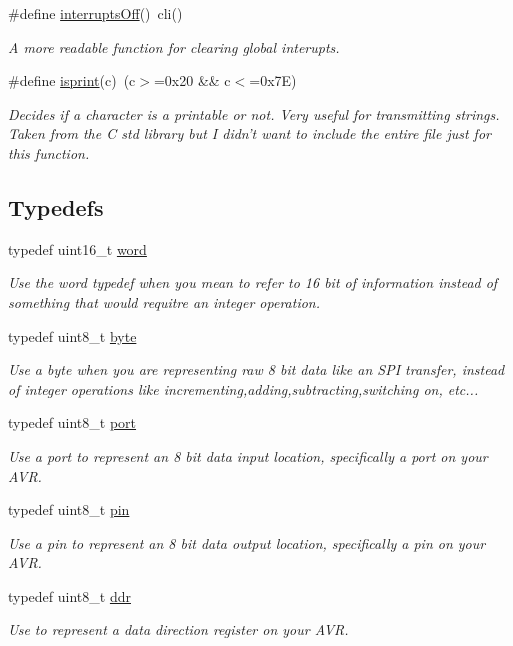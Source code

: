 \begin{DoxyCompactItemize}
\#define \hyperlink{a00011_aa4619e4d163866f6c3d81c389ae7264d}{interrupts\-Off}()~cli()
\begin{DoxyCompactList}\small\item\em A more readable function for clearing global interupts. \end{DoxyCompactList}\item 
\#define \hyperlink{a00011_a889820984b313e4f379d998ce05892ec}{isprint}(c)~(c$>$=0x20 \&\& c$<$=0x7\-E)
\begin{DoxyCompactList}\small\item\em Decides if a character is a printable or not. Very useful for transmitting strings. Taken from the C std library but I didn't want to include the entire file just for this function. \end{DoxyCompactList}\end{DoxyCompactItemize}
\subsection*{Typedefs}
\begin{DoxyCompactItemize}
\item 
typedef uint16\-\_\-t \hyperlink{a00011_a69584ba90b098f23df3702374e594862}{word}
\begin{DoxyCompactList}\small\item\em Use the word typedef when you mean to refer to 16 bit of information instead of something that would requitre an integer operation. \end{DoxyCompactList}\item 
typedef uint8\-\_\-t \hyperlink{a00011_a82b52bf2b45e214a8f2100ebfdf1aee4}{byte}
\begin{DoxyCompactList}\small\item\em Use a byte when you are representing raw 8 bit data like an S\-P\-I transfer, instead of integer operations like incrementing,adding,subtracting,switching on, etc... \end{DoxyCompactList}\item 
typedef uint8\-\_\-t \hyperlink{a00011_af8fb0f45ee0195c7422a49e6a8d72369}{port}
\begin{DoxyCompactList}\small\item\em Use a port to represent an 8 bit data input location, specifically a port on your A\-V\-R. \end{DoxyCompactList}\item 
typedef uint8\-\_\-t \hyperlink{a00011_aed45ca508d997dd992682abff8790bde}{pin}
\begin{DoxyCompactList}\small\item\em Use a pin to represent an 8 bit data output location, specifically a pin on your A\-V\-R. \end{DoxyCompactList}\item 
typedef uint8\-\_\-t \hyperlink{a00011_ae36b1ebcd4ca31bf51d6c3d39490e490}{ddr}
\begin{DoxyCompactList}\small\item\em Use to represent a data direction register on your A\-V\-R. \end{DoxyCompactList}\end{DoxyCompactItemize}
